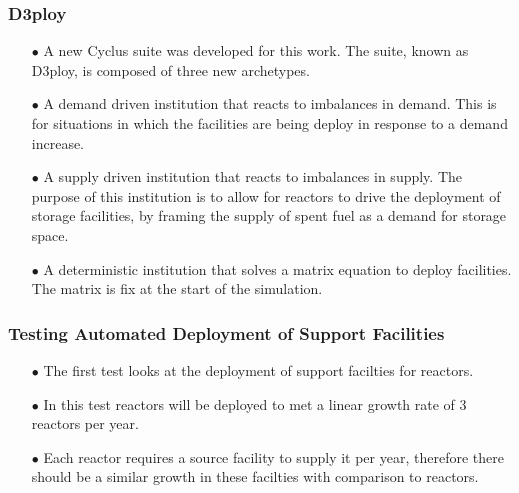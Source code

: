 \begin{frame}
  \frametitle{D3ploy}
  \begin{itemize}
      \item[$\bullet$] A new Cyclus suite was developed for this
                       work. The suite, known as D3ploy, is composed
                       of three new archetypes.
      \item[$\bullet$] A demand driven institution that reacts to 
                       imbalances in demand. This is for situations in
                       which the facilities are being deploy in response
                       to a demand increase.
      \item[$\bullet$] A supply driven institution that reacts to 
                       imbalances in supply. The purpose of this institution
                       is to allow for reactors to drive the deployment
                       of storage facilities, by framing the supply
                       of spent fuel as a demand for storage space. 
      \item[$\bullet$] A deterministic institution that solves a matrix
                       equation to deploy facilities. The matrix is fix
                       at the start of the simulation.

   \end{itemize}        
\end{frame}

\begin{frame}
  \frametitle{Testing Automated Deployment of Support Facilities}
  \begin{itemize}
      \item[$\bullet$] The first test looks at the deployment of support
                       facilties for reactors. 
      \item[$\bullet$] In this test reactors will be deployed to met a linear
                       growth rate of 3 reactors per year. 
      \item[$\bullet$] Each reactor requires a source facility to supply it
                       per year, therefore there should be a similar growth
                       in these facilties with comparison to reactors. 
   \end{itemize}        
\end{frame}

